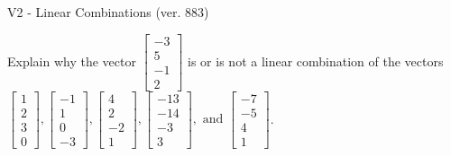 \begin{exercise}
  \begin{exerciseTitle}V2 - Linear Combinations (ver. 883)\end{exerciseTitle}
  \begin{exerciseStatement}
    Explain why the vector \(\left[\begin{array}{c}
-3 \\
5 \\
-1 \\
2
\end{array}\right]\)  is or is not a linear 
	combination of the vectors \(\left[\begin{array}{c}
1 \\
2 \\
3 \\
0
\end{array}\right] , \left[\begin{array}{c}
-1 \\
1 \\
0 \\
-3
\end{array}\right] , \left[\begin{array}{c}
4 \\
2 \\
-2 \\
1
\end{array}\right] , \left[\begin{array}{c}
-13 \\
-14 \\
-3 \\
3
\end{array}\right] , \text{ and } \left[\begin{array}{c}
-7 \\
-5 \\
4 \\
1
\end{array}\right]\).
	



\end{exerciseStatement}
\end{exercise}
